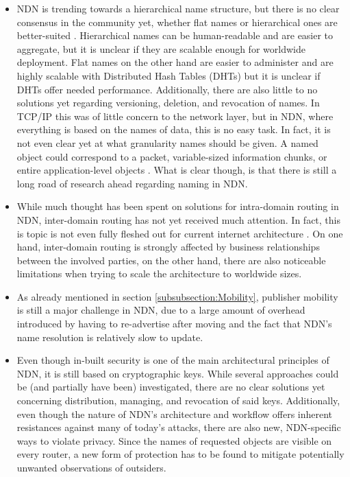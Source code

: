\begin{itemize}
	
	\item NDN is trending towards a hierarchical name structure, but there is no clear consensus in the community yet, whether flat names or hierarchical ones are better-suited \cite{XVSF+13}. Hierarchical names can be human-readable and are easier to aggregate, but it is unclear if they are scalable enough for worldwide deployment. Flat names on the other hand are easier to administer and are highly scalable with Distributed Hash Tables (DHTs) but it is unclear if DHTs offer needed performance. Additionally, there are also little to no solutions yet regarding versioning, deletion, and revocation of names. In TCP/IP this was of little concern to the network layer, but in NDN, where everything is based on the names of data, this is no easy task. In fact, it is not even clear yet at what granularity names should be given. A named object could correspond to a packet, variable-sized information chunks, or entire application-level objects \cite{XVSF+13}. What is clear though, is that there is still a long road of research ahead regarding naming in NDN.
	
	\item While much thought has been spent on solutions for intra-domain routing in NDN, inter-domain routing has not yet received much attention. In fact, this is topic is not even fully fleshed out for current internet architecture \cite{XVSF+13}. On one hand, inter-domain routing is strongly affected by business relationships between the involved parties, on the other hand, there are also noticeable limitations when trying to scale the architecture to worldwide sizes. 
	
	\item As already mentioned in section \ref{subsubsection:Mobility}, publisher mobility is still a major challenge in NDN, due to a large amount of overhead introduced by having to re-advertise after moving and the fact that NDN's name resolution is relatively slow to update.
	
	\item Even though in-built security is one of the main architectural principles of NDN, it is still based on cryptographic keys. While several approaches could be (and partially have been) investigated, there are no clear solutions yet concerning distribution, managing, and revocation of said keys. Additionally, even though the nature of NDN's architecture and workflow offers inherent resistances against many of today's attacks, there are also new, NDN-specific ways to violate privacy. Since the names of requested objects are visible on every router, a new form of protection has to be found to mitigate potentially unwanted observations of outsiders.
	

\end{itemize}
